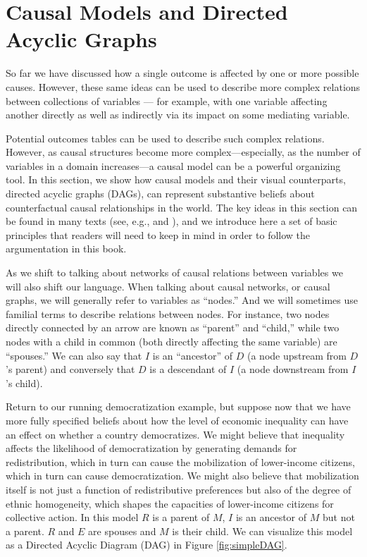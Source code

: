 \documentclass[
  12pt,
]{book}
\begin{document}
\hypertarget{causal-models-and-directed-acyclic-graphs}{%
\section{Causal Models and Directed Acyclic Graphs}\label{causal-models-and-directed-acyclic-graphs}}

So far we have discussed how a single outcome is affected by one or more possible causes. However, these same ideas can be used to describe more complex relations between collections of variables --- for example, with one variable affecting another directly as well as indirectly via its impact on some mediating variable.

Potential outcomes tables can be used to describe such complex relations. However, as causal structures become more complex---especially, as the number of variables in a domain increases---a causal model can be a powerful organizing tool. In this section, we show how causal models and their visual counterparts, directed acyclic graphs (DAGs), can represent substantive beliefs about counterfactual causal relationships in the world. The key ideas in this section can be found in many texts (see, e.g., \citet{halpern2005causesa} and \citet{galles1998axiomatic}), and we introduce here a set of basic principles that readers will need to keep in mind in order to follow the argumentation in this book.

As we shift to talking about networks of causal relations between variables we will also shift our language. When talking about causal networks, or causal graphs, we will generally refer to variables as ``nodes.'' And we will sometimes use familial terms to describe relations between nodes. For instance, two nodes directly connected by an arrow are known as ``parent'' and ``child,'' while two nodes with a child in common (both directly affecting the same variable) are ``spouses.'' We can also say that \(I\) is an ``ancestor'' of \(D\) (a node upstream from \(D\)'s parent) and conversely that \(D\) is a descendant of \(I\) (a node downstream from \(I\)'s child).

Return to our running democratization example, but suppose now that we have more fully specified beliefs about how the level of economic inequality can have an effect on whether a country democratizes. We might believe that inequality affects the likelihood of democratization by generating demands for redistribution, which in turn can cause the mobilization of lower-income citizens, which in turn can cause democratization. We might also believe that mobilization itself is not just a function of redistributive preferences but also of the degree of ethnic homogeneity, which shapes the capacities of lower-income citizens for collective action. In this model \(R\) is a parent of \(M\), \(I\) is an ancestor of \(M\) but not a parent. \(R\) and \(E\) are spouses and \(M\) is their child. We can visualize this model as a Directed Acyclic Diagram (DAG) in Figure \ref{fig:simpleDAG}.
\end{document}
